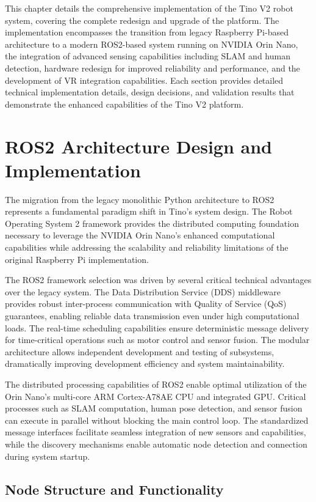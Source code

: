 This chapter details the comprehensive implementation of the Tino V2 robot system, covering the complete redesign and upgrade of the platform. The implementation encompasses the transition from legacy Raspberry Pi-based architecture to a modern ROS2-based system running on NVIDIA Orin Nano, the integration of advanced sensing capabilities including SLAM and human detection, hardware redesign for improved reliability and performance, and the development of VR integration capabilities. Each section provides detailed technical implementation details, design decisions, and validation results that demonstrate the enhanced capabilities of the Tino V2 platform.

\section{ROS2 Architecture Design and Implementation}

The migration from the legacy monolithic Python architecture to ROS2 represents a fundamental paradigm shift in Tino's system design. The Robot Operating System 2 framework provides the distributed computing foundation necessary to leverage the NVIDIA Orin Nano's enhanced computational capabilities while addressing the scalability and reliability limitations of the original Raspberry Pi implementation.

The ROS2 framework selection was driven by several critical technical advantages over the legacy system. The Data Distribution Service (DDS) middleware provides robust inter-process communication with Quality of Service (QoS) guarantees, enabling reliable data transmission even under high computational loads. The real-time scheduling capabilities ensure deterministic message delivery for time-critical operations such as motor control and sensor fusion. The modular architecture allows independent development and testing of subsystems, dramatically improving development efficiency and system maintainability.

The distributed processing capabilities of ROS2 enable optimal utilization of the Orin Nano's multi-core ARM Cortex-A78AE CPU and integrated GPU. Critical processes such as SLAM computation, human pose detection, and sensor fusion can execute in parallel without blocking the main control loop. The standardized message interfaces facilitate seamless integration of new sensors and capabilities, while the discovery mechanisms enable automatic node detection and connection during system startup.

\subsection{Node Structure and Functionality}


